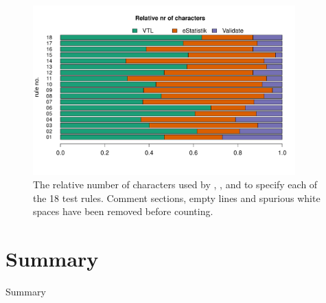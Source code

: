 \begin{figure}
\centering
\includegraphics[width=0.9\textwidth]{fig/barplot.pdf}
\caption{The relative number of characters used by ,
, and  to specify each of the 18 test rules.
Comment sections, empty lines and spurious white spaces have been removed
before counting. }
\end{figure}


\section{Summary}

Summary
